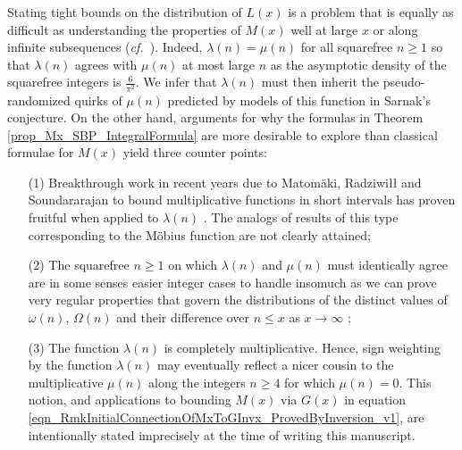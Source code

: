 \documentclass[11pt,reqno,a4letter]{article}
\newcommand{\hlocalref}[1]{\hyperref[#1]{\ref{#1}}}
\numberwithin{equation}{section}
\numberwithin{figure}{section}
\numberwithin{table}{section}
\let\citep\cite
\newcommand{\cf}{\textit{cf.\ }}
\theoremstyle{plain}
\numberwithin{theorem}{section}
\theoremstyle{definition}
\begin{document}
Stating tight bounds on the distribution of 
$L(x)$ is a problem that is equally as difficult 
as understanding the properties of $M(x)$ well at large $x$ or 
along infinite subsequences (\cf \cite{MR2877066,MR3779960,TAO-LOGAVGD-CHOWLA}). 
Indeed, $\lambda(n) = \mu(n)$ for all squarefree $n \geq 1$ so that 
$\lambda(n)$ agrees with $\mu(n)$ at most large $n$ as the asymptotic density of the 
squarefree integers is $\frac{6}{\pi^2}$. 
We infer that $\lambda(n)$ must then inherit the pseudo-randomized quirks 
of $\mu(n)$ predicted by models of this function in Sarnak's conjecture. 
On the other hand, arguments for why the formulas in 
Theorem \hlocalref{prop_Mx_SBP_IntegralFormula} are more desirable to explore than 
classical formulae for $M(x)$ yield three counter points:
\begin{itemize}
\item[(1)] Breakthrough work in recent years due to 
	Matom\"aki, Radziwi{\l\l} and Soundararajan to 
	bound multiplicative functions 
	in short intervals has 
	proven fruitful when applied to $\lambda(n)$ 
	\cite{SOUND-LLAMBDA-SHORT-INTS,MATRADZE-MULTFUNCS-SHORT-INTS}. 
	The analogs of results of this type corresponding 
	to the M\"obius function are not clearly attained; 
\item[(2)] The squarefree $n \geq 1$ on which $\lambda(n)$ and $\mu(n)$ must identically agree 
	are in some senses easier integer cases to handle 
	insomuch as we can prove very regular properties 
	that govern the distributions of the distinct values of 
	$\omega(n)$, $\Omega(n)$ and their difference over $n \leq x$ as $x \rightarrow \infty$ 
	\citep[\cf \S 2.4; \S 7.4]{MV}; 
\item[(3)] The function $\lambda(n)$ is completely 
	multiplicative. Hence, sign weighting by the function $\lambda(n)$ may eventually reflect 
	a nicer cousin to the multiplicative $\mu(n)$ along the 
	integers $n \geq 4$ for which $\mu(n) = 0$. 
	This notion, and applications to bounding $M(x)$ via $G(x)$ in 
	equation \eqref{eqn_RmkInitialConnectionOfMxToGInvx_ProvedByInversion_v1}, 
	are intentionally stated imprecisely at the time of writing this manuscript.
\end{itemize}

\renewcommand{\refname}{References} 

\end{document}
